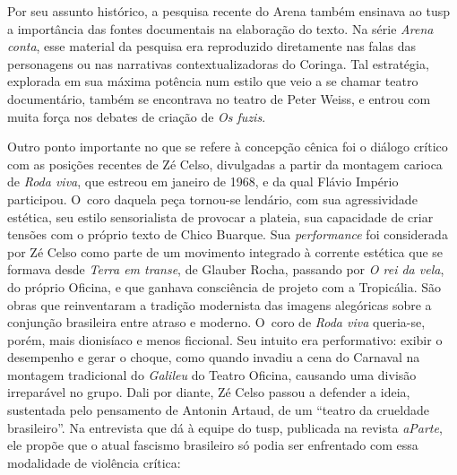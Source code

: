 {Por seu assunto histórico, a pesquisa recente do Arena também ensinava
ao {\sc tusp} a importância das fontes documentais na elaboração do texto. Na
série {\it Arena conta}, esse material da pesquisa era reproduzido
diretamente nas falas das personagens ou nas narrativas
contextualizadoras do Coringa. Tal estratégia, explorada em sua máxima
potência num estilo que veio a se chamar teatro documentário,
também se encontrava no teatro de Peter Weiss, e entrou com muita força
nos debates de criação de {\it Os fuzis}.

Outro ponto importante no que se refere à concepção cênica foi o diálogo
crítico com as posições recentes de Zé Celso, divulgadas a partir da
montagem carioca de {\it Roda viva}, que estreou em janeiro de 1968, e
da qual Flávio Império participou. O~coro daquela peça tornou-se
lendário, com sua agressividade estética, seu estilo sensorialista de
provocar a plateia, sua capacidade de criar tensões com o próprio texto
de Chico Buarque. Sua {\it performance} foi considerada por Zé Celso
como parte de um movimento integrado à corrente estética que se formava
desde {\it Terra em transe}, de Glauber Rocha, passando por {\it O rei
da vela}, do próprio Oficina, e que ganhava consciência de projeto com a
Tropicália. São obras que reinventaram a tradição modernista das imagens
alegóricas sobre a conjunção brasileira entre atraso e moderno. O~coro
de {\it Roda viva} queria-se, porém, mais dionisíaco e menos ficcional.
Seu intuito era performativo: exibir o desempenho e gerar o choque, como
quando invadiu a cena do Carnaval na montagem tradicional do
{\it Galileu} do Teatro Oficina, causando uma divisão irreparável no
grupo. Dali por diante, Zé Celso passou a defender a ideia, sustentada
pelo pensamento de Antonin Artaud, de um “teatro da crueldade
brasileiro”. Na entrevista que dá à equipe do {\sc tusp}, publicada na revista
{\it aParte}, ele propõe que o atual fascismo brasileiro só podia ser
enfrentado com essa modalidade de violência crítica:

\startblockquote
{}
\stopblockquote

}
